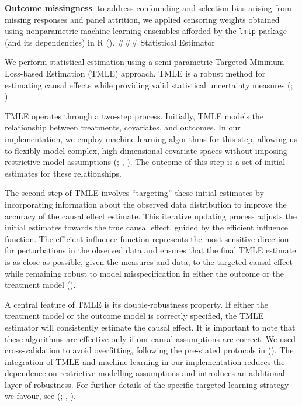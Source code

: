 \documentclass[
  single column]{article}
\begin{document}
\textbf{Outcome missingness}: to address confounding and selection bias
arising from missing responses and panel attrition, we applied censoring
weights obtained using nonparametric machine learning ensembles afforded
by the \texttt{lmtp} package (and its dependencies) in R
(). \#\#\#
Statistical Estimator

We perform statistical estimation using a semi-parametric Targeted
Minimum Loss-based Estimation (TMLE) approach. TMLE is a robust method
for estimating causal effects while providing valid statistical
uncertainty measures (; ).

TMLE operates through a two-step process. Initially, TMLE models the
relationship between treatments, covariates, and outcomes. In our
implementation, we employ machine learning algorithms for this step,
allowing us to flexibly model complex, high-dimensional covariate spaces
without imposing restrictive model assumptions
(;
,
). The outcome of this step is a set
of initial estimates for these relationships.

The second step of TMLE involves ``targeting'' these initial estimates
by incorporating information about the observed data distribution to
improve the accuracy of the causal effect estimate. This iterative
updating process adjusts the initial estimates towards the true causal
effect, guided by the efficient influence function. The efficient
influence function represents the most sensitive direction for
perturbations in the observed data and ensures that the final TMLE
estimate is as close as possible, given the measures and data, to the
targeted causal effect while remaining robust to model misspecification
in either the outcome or the treatment model
().

A central feature of TMLE is its double-robustness property. If either
the treatment model or the outcome model is correctly specified, the
TMLE estimator will consistently estimate the causal effect. It is
important to note that these algorithms are effective only if our causal
assumptions are correct. We used cross-validation to avoid overfitting,
following the pre-stated protocols in
(). The integration
of TMLE and machine learning in our implementation reduces the
dependence on restrictive modelling assumptions and introduces an
additional layer of robustness. For further details of the specific
targeted learning strategy we favour, see
(;
,
).
\end{document}
